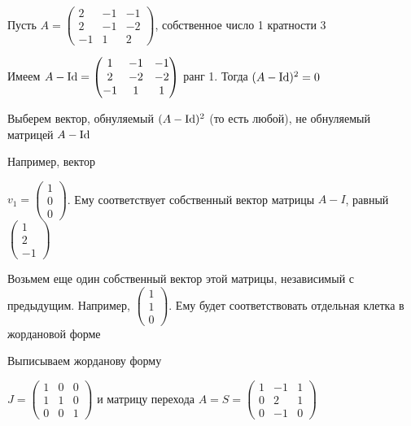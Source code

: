 \documentclass[12pt]{article}
\begin{document}
\begin{Example}{}
    Пусть $A = \begin{pmatrix}
        2 & -1 & -1 \\
        2 & -1 & -2 \\
        -1 & 1 & 2
    \end{pmatrix}$, собственное число 1 кратности 3

    Имеем $A - \operatorname{Id} = \begin{pmatrix}
        1 & -1 & -1 \\
        2 & -2 & -2 \\
        -1 & 1 & 1
    \end{pmatrix}$ ранг 1. Тогда $(A - \operatorname{Id})^2 = 0$

    Выберем вектор, обнуляемый $(A - \operatorname{Id})^2$ (то есть любой), не обнуляемый матрицей $A - \operatorname{Id}$

    Например, вектор 
    
    $v_1 = \begin{pmatrix}
        1 \\
        0 \\
        0
    \end{pmatrix}$. Ему соответствует собственный вектор матрицы $A - I$, равный $\begin{pmatrix}
        1 \\
        2 \\
        -1
    \end{pmatrix}$
    
    Возьмем еще один собственный вектор этой матрицы, независимый с предыдущим. Например, $\begin{pmatrix}
        1 \\
        1 \\
        0
    \end{pmatrix}$. Ему будет соответствовать отдельная клетка в жордановой форме 

    Выписываем жорданову форму 
    
    $J = \begin{pmatrix}
        1 & 0 & 0 \\
        1 & 1 & 0 \\
        0 & 0 & 1
    \end{pmatrix}$ и матрицу перехода $A = S = \begin{pmatrix}
        1 & -1 & 1 \\
        0 & 2 & 1 \\
        0 & -1 & 0
    \end{pmatrix}$
\end{Example}
\end{document}
